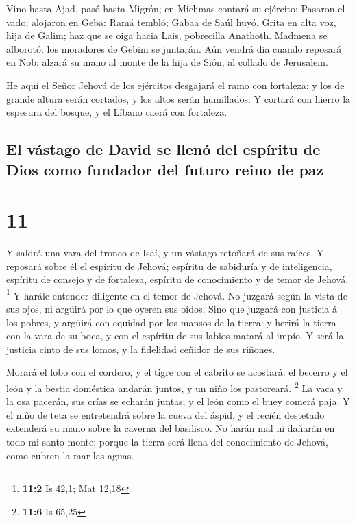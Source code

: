  Vino hasta Ajad, pasó hasta Migrón; en Michmas contará su
ejército:  Pasaron el vado; alojaron en Geba: Ramá tembló;
Gabaa de Saúl huyó.  Grita en alta voz, hija de Galim; haz
que se oiga hacia Lais, pobrecilla Anathoth.  Madmena se
alborotó: los moradores de Gebim se juntarán.  Aún vendrá
día cuando reposará en Nob: alzará su mano al monte de la hija de Sión,
al collado de Jerusalem.

 He aquí el Señor Jehová de los ejércitos desgajará el ramo
con fortaleza: y los de grande altura serán cortados, y los altos serán
humillados.  Y cortará con hierro la espesura del bosque, y
el Líbano caerá con fortaleza.

\hypertarget{el-vuxe1stago-de-david-se-llenuxf3-del-espuxedritu-de-dios-como-fundador-del-futuro-reino-de-paz}{%
\subsection{El vástago de David se llenó del espíritu de Dios como
fundador del futuro reino de
paz}\label{el-vuxe1stago-de-david-se-llenuxf3-del-espuxedritu-de-dios-como-fundador-del-futuro-reino-de-paz}}

\hypertarget{section-10}{%
\section{11}\label{section-10}}

 Y saldrá una vara del tronco de Isaí, y un vástago retoñará
de sus raíces.  Y reposará sobre él el espíritu de Jehová;
espíritu de sabiduría y de inteligencia, espíritu de consejo y de
fortaleza, espíritu de conocimiento y de temor de Jehová. \footnote{\textbf{11:2}
  Is 42,1; Mat 12,18}  Y harále entender diligente en el
temor de Jehová. No juzgará según la vista de sus ojos, ni argüirá por
lo que oyeren sus oídos;  Sino que juzgará con justicia á
los pobres, y argüirá con equidad por los mansos de la tierra: y herirá
la tierra con la vara de su boca, y con el espíritu de sus labios matará
al impío.  Y será la justicia cinto de sus lomos, y la
fidelidad ceñidor de sus riñones.

 Morará el lobo con el cordero, y el tigre con el cabrito se
acostará: el becerro y el león y la bestia doméstica andarán juntos, y
un niño los pastoreará. \footnote{\textbf{11:6} Is 65,25} 
La vaca y la osa pacerán, sus crías se echarán juntas; y el león como el
buey comerá paja.  Y el niño de teta se entretendrá sobre la
cueva del áspid, y el recién destetado extenderá su mano sobre la
caverna del basilisco.  No harán mal ni dañarán en todo mi
santo monte; porque la tierra será llena del conocimiento de Jehová,
como cubren la mar las aguas.

